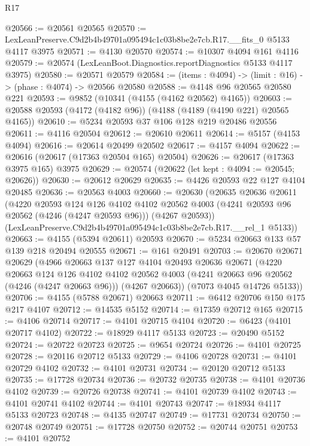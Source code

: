 \begin{lexlean}{R17}
\begin{coremodule}
@20566 := @20561 @20565
@20570 := LexLeanPreserve.C9d2b4b49701a095494c1c03b8be2e7cb.R17.__fits_0 @5133 @4117 @3975
@20571 := @4130 @20570
@20574 := @10307 @4094 @161 @4116
@20579 := @20574 (LexLeanBoot.Diagnostics.reportDiagnostics @5133 @4117 @3975)
@20580 := @20571 @20579
@20584 := (items : @4094) -> (limit : @16) -> (phase : @4074) -> @20566 @20580
@20588 := @4148 @96 @20565 @20580 @221
@20593 := @9852 (@10341 (@4155 (@4162 @20562) @4165))
@20603 := @20588 @20593 (@4172 (@4182 @96)) (@4188 (@4189 (@4190 @221) @20565 @4165))
@20610 := @5234 @20593 @37 @106 @128 @219 @20486 @20556
@20611 := @4116 @20504
@20612 := @20610 @20611
@20614 := @5157 (@4153 @4094)
@20616 := @20614 @20499 @20502
@20617 := @4157 @4094
@20622 := @20616 (@20617 (@17363 @20504 @165) @20504)
@20626 := @20617 (@17363 @3975 @165) @3975
@20629 := @20574 (@20622 (let kept : @4094 := @20545; @20626))
@20630 := @20612 @20629
@20635 := @4426 @20593 @22 @127 @4104 @20485
@20636 := @20563 @4003
@20660 := @20630
    (@20635
      @20636
      @20611
      (@4220
        @20593
        @124
        @126
        @4102
        @4102
        @20562
        @4003
        (@4241 @20593 @96 @20562 (@4246 (@4247 @20593 @96)))
        (@4267 @20593))
      (LexLeanPreserve.C9d2b4b49701a095494c1c03b8be2e7cb.R17.__rel_1 @5133))
@20663 := @4155 (@5394 @20611) @20593
@20670 := @5234 @20663 @133 @57 @139 @218 @20494 @20555
@20671 := @161 @20491
@20703 := @20670
    @20671
    @20629
    (@4966
      @20663
      @137
      @127
      @4104
      @20493
      @20636
      @20671
      (@4220
        @20663
        @124
        @126
        @4102
        @4102
        @20562
        @4003
        (@4241 @20663 @96 @20562 (@4246 (@4247 @20663 @96)))
        (@4267 @20663))
      (@7073 @4045 @14726 @5133))
@20706 := @4155 (@5788 @20671) @20663
@20711 := @6412 @20706 @150 @175 @217 @4107
@20712 := @14535 @5152
@20714 := @17359 @20712 @165
@20715 := @4106 @20714
@20717 := @4101 @20715 @4104
@20720 := @6423 (@4101 @20717 @4102)
@20722 := @18929 @4117 @5133
@20723 := @20490 @5152
@20724 := @20722 @20723
@20725 := @9654 @20724
@20726 := @4101 @20725
@20728 := @20116 @20712 @5133
@20729 := @4106 @20728
@20731 := @4101 @20729 @4102
@20732 := @4101 @20731
@20734 := @20120 @20712 @5133
@20735 := @17728 @20734
@20736 := @20732 @20735
@20738 := @4101 @20736 @4102
@20739 := @20726 @20738
@20741 := @4101 @20739 @4102
@20743 := @4101 @20741 @4102
@20744 := @4101 @20743
@20747 := @18934 @4117 @5133 @20723
@20748 := @4135 @20747
@20749 := @17731 @20734
@20750 := @20748 @20749
@20751 := @17728 @20750
@20752 := @20744 @20751
@20753 := @4101 @20752

\end{coremodule}
\end{lexlean}
